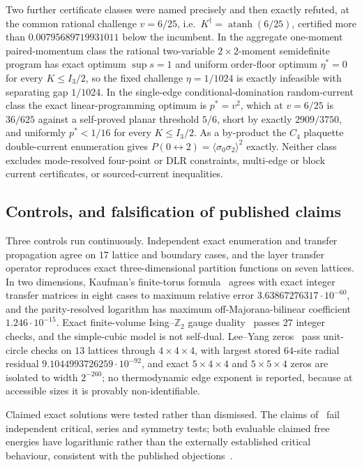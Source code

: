 \documentclass[11pt]{article}
\theoremstyle{definition}
\newcommand{\Zb}{\mathbb{Z}}
\begin{document}
Two further certificate classes were named precisely and then exactly refuted, at the common rational
challenge $v=6/25$, i.e.\ $K^\dagger=\operatorname{atanh}(6/25)$, certified more than
$0.00795689719931011$ below the incumbent. In the aggregate one-moment paired-momentum class the
rational two-variable $2\times2$-moment semidefinite program has exact optimum $\sup s=1$ and uniform
order-floor optimum $\eta^*=0$ for every $K\le I_3/2$, so the fixed challenge $\eta=1/1024$ is exactly
infeasible with separating gap $1/1024$. In the single-edge conditional-domination random-current
class the exact linear-programming optimum is $p^*=v^2$, which at $v=6/25$ is $36/625$ against a
self-proved planar threshold $5/6$, short by exactly $2909/3750$, and uniformly $p^*<1/16$ for every
$K\le I_3/2$. As a by-product the $C_4$ plaquette double-current enumeration gives
$P(0\leftrightarrow2)=\langle\sigma_0\sigma_2\rangle^2$ exactly. Neither class excludes mode-resolved
four-point or DLR constraints, multi-edge or block current certificates, or sourced-current
inequalities.

\subsection{Controls, and falsification of published claims}
Three controls run continuously. Independent exact enumeration and transfer propagation agree on
$17$ lattice and boundary cases, and the layer transfer operator reproduces exact three-dimensional
partition functions on seven lattices. In two dimensions, Kaufman's finite-torus
formula~\cite{kaufman1949} agrees with exact integer transfer matrices in eight cases to maximum
relative error $3.63867276317\cdot10^{-60}$, and the parity-resolved logarithm has maximum
off-Majorana-bilinear coefficient $1.246\cdot10^{-15}$. Exact finite-volume Ising--$\Zb_2$ gauge
duality~\cite{wegner1971} passes $27$ integer checks, and the simple-cubic model is not self-dual.
Lee--Yang zeros~\cite{leeyang1952,yang1952} pass unit-circle checks on $13$ lattices through
$4\times4\times4$, with largest stored $64$-site radial residual $9.1044993726259\cdot10^{-92}$, and
exact $5\times4\times4$ and $5\times5\times4$ zeros are isolated to width $2^{-260}$; no thermodynamic
edge exponent is reported, because at accessible sizes it is provably non-identifiable.

Claimed exact solutions were tested rather than dismissed. The claims
of~\cite{zhang2007,zhang2021} fail independent critical, series and symmetry tests; both evaluable
claimed free energies have logarithmic rather than the externally established
critical behaviour, consistent with the published objections~\cite{wu2008comment,perk2022comment}.
\end{document}
